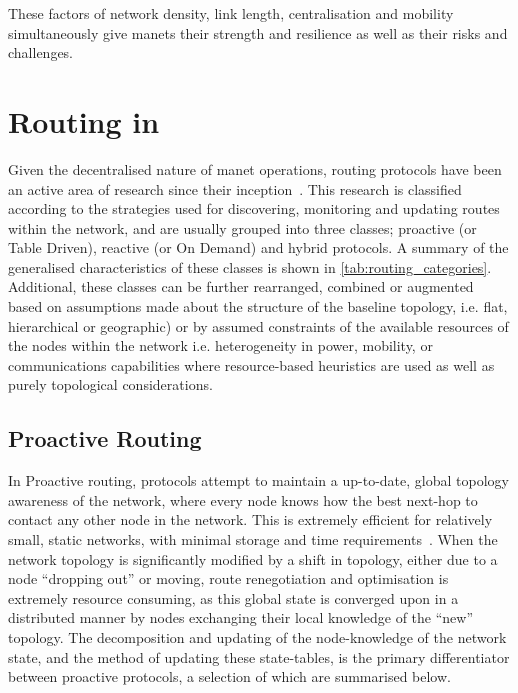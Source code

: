 These factors of network density, link length, centralisation and mobility simultaneously give \glspl{manet} their strength and resilience as well as their risks and challenges.


\section{Routing in }\label{sec:manet_routing}

Given the decentralised nature of \gls{manet} operations, routing protocols have been an active area of research since their inception~\cite{Jubin1987}.
This research is classified according to the strategies used for discovering, monitoring and updating routes within the network, and are usually grouped into three classes; proactive (or Table Driven), reactive (or On Demand) and hybrid protocols.
A summary of the generalised characteristics of these classes is shown in \autoref{tab:routing_categories}.
Additional, these classes can be further rearranged, combined or augmented based on assumptions made about the structure of the baseline topology, i.e. flat, hierarchical or geographic) or by assumed constraints of the available resources of the nodes within the network i.e. heterogeneity in power, mobility, or communications capabilities where resource-based heuristics are used as well as purely topological considerations\cite{Li2005,Gerla2002}.


\subsection{Proactive Routing}

In Proactive routing, protocols attempt to maintain a up-to-date, global topology awareness of the network, where every node knows how the best next-hop to contact any other node in the network.
This is extremely efficient for relatively small, static networks, with minimal storage and time requirements~\cite{Mbarushimana2007}.
When the network topology is significantly modified by a shift in topology, either due to a node ``dropping out'' or moving, route renegotiation and optimisation is extremely resource consuming, as this global state is converged upon in a distributed manner by nodes exchanging their local knowledge of the ``new'' topology.
The decomposition and updating of the node-knowledge of the network state, and the method of updating these state-tables, is the primary differentiator between proactive protocols, a selection of which are summarised below.

